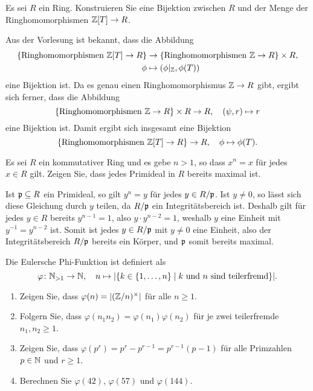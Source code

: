\begin{question}
  Es sei $R$ ein Ring.
  Konstruieren Sie eine Bijektion zwischen $R$ und der Menge der Ringhomomorphismen $\mathbb{Z}[T] \to R$.
\end{question}


\begin{solution}
  Aus der Vorlesung ist bekannt, dass die Abbildung
  \begin{align*}
              \{ \text{Ringhomomorphismen $\mathbb{Z}[T] \to R$} \}
    &\to      \{ \text{Ringhomomorphismen $\mathbb{Z} \to R$} \} \times R,
    \\
              \phi
    &\mapsto  (\phi|_{\mathbb{Z}}, \phi(T))
  \end{align*}
  eine Bijektion ist.
  Da es genau einen Ringhomomorphismus $\mathbb{Z} \to R$ gibt, ergibt sich ferner, dass die Abbildung
  \[
            \{ \text{Ringhomomorphismen $\mathbb{Z} \to R$} \} \times R
    \to     R,
    \quad
            (\psi, r)
    \mapsto r
  \]
  eine Bijektion ist.
  Damit ergibt sich insgesamt eine Bijektion
  \[
            \{ \text{Ringhomomorphismen $\mathbb{Z}[T] \to R$} \}
    \to     R,
    \quad
            \phi
    \mapsto \phi(T).
  \]
\end{solution}


\begin{question}
  Es sei $R$ ein kommutativer Ring und es gebe $n > 1$, so dass $x^n = x$ für jedes $x \in R$ gilt.
  Zeigen Sie, dass jedes Primideal in $R$ bereits maximal ist.
\end{question}


\begin{solution}
  Ist $\mathfrak{p} \subseteq R$ ein Primideal, so gilt $y^n = y$ für jedes $y \in R/\mathfrak{p}$.
  Ist $y \neq 0$, so lässt sich diese Gleichung durch $y$ teilen, da $R/\mathfrak{p}$ ein Integritätsbereich ist.
  Deshalb gilt für jedes $y \in R$ bereits $y^{n-1} = 1$, also $y \cdot y^{n-2} = 1$, weshalb $y$ eine Einheit mit $y^{-1} = y^{n-2}$ ist.
  Somit ist jedes $y \in R/\mathfrak{p}$ mit $y \neq 0$ eine Einheit, also der Integritätsbereich $R/\mathfrak{p}$ bereits ein Körper, und $\mathfrak{p}$ somit bereits maximal.
\end{solution}


\begin{question}[subtitle = Die Eulersche Phi-Funktion]
  Die Eulersche Phi-Funktion ist definiert als
  \[
            \varphi
    \colon  \mathbb{N}_{>1} \to \mathbb{N},
    \quad   n \mapsto |\{ k \in \{1, \dotsc, n\} \mid \text{$k$ und $n$ sind teilerfremd} \}|.
  \]
  \begin{enumerate}
    \item
      Zeigen Sie, dass $\varphi(n) = | (\mathbb{Z}/n)^\times |$ für alle $n \geq 1$.
    \item
      Folgern Sie, dass $\varphi(n_1 n_2) = \varphi(n_1) \varphi(n_2)$ für je zwei teilerfremde $n_1, n_2 \geq 1$.
    \item
      Zeigen Sie, dass $\varphi(p^r) = p^r - p^{r-1} = p^{r-1} (p - 1)$ für alle Primzahlen $p \in \mathbb{N}$ und $r \geq 1$.
    \item
      Berechnen Sie $\varphi(42)$, $\varphi(57)$ und $\varphi(144)$.
  \end{enumerate}
\end{question}


